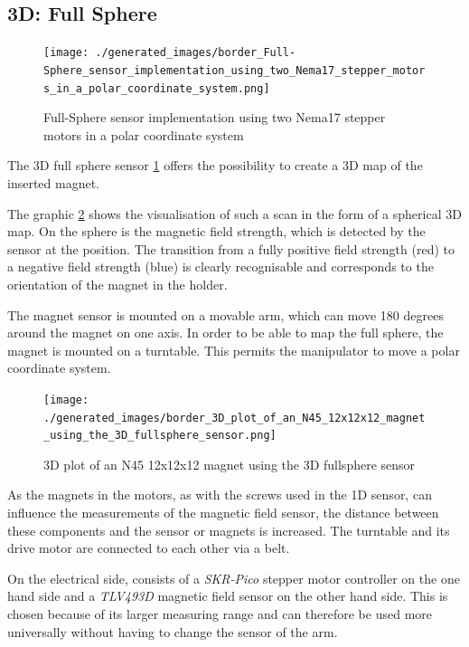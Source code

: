 \hypertarget{d-full-sphere}{%
\subsection{3D: Full Sphere}\label{d-full-sphere}}

\begin{figure}
\centering
\texttt{[image: ./generated\_images/border\_Full-Sphere\_sensor\_implementation\_using\_two\_Nema17\_stepper\_motors\_in\_a\_polar\_coordinate\_system.png]}
\caption{Full-Sphere sensor implementation using two Nema17 stepper
motors in a polar coordinate system
\label{Full-Sphere_sensor_implementation_using_two_Nema17_stepper_motors_in_a_polar_coordinate_system.png}}
\end{figure}

The 3D full sphere sensor
\ref{Full-Sphere_sensor_implementation_using_two_Nema17_stepper_motors_in_a_polar_coordinate_system.png}
offers the possibility to create a 3D map of the inserted magnet.

The graphic
\ref{3D_plot_of_an_N45_12x12x12_magnet_using_the_3D_fullsphere_sensor.png}
shows the visualisation of such a scan in the form of a spherical 3D
map. On the sphere is the magnetic field strength, which is detected by
the sensor at the position. The transition from a fully positive field
strength (red) to a negative field strength (blue) is clearly
recognisable and corresponds to the orientation of the magnet in the
holder.

The magnet sensor is mounted on a movable arm, which can move 180
degrees around the magnet on one axis. In order to be able to map the
full sphere, the magnet is mounted on a turntable. This permits the
manipulator to move a polar coordinate system.

\begin{figure}
\centering
\texttt{[image: ./generated\_images/border\_3D\_plot\_of\_an\_N45\_12x12x12\_magnet\_using\_the\_3D\_fullsphere\_sensor.png]}
\caption{3D plot of an N45 12x12x12 magnet using the 3D fullsphere
sensor
\label{3D_plot_of_an_N45_12x12x12_magnet_using_the_3D_fullsphere_sensor.png}}
\end{figure}

As the magnets in the motors, as with the screws used in the 1D sensor,
can influence the measurements of the magnetic field sensor, the
distance between these components and the sensor or magnets is
increased. The turntable and its drive motor are connected to each other
via a belt.

On the electrical side, consists of a \emph{SKR-Pico} stepper motor
controller on the one hand side and a \emph{TLV493D} magnetic field
sensor on the other hand side. This is chosen because of its larger
measuring range and can therefore be used more universally without
having to change the sensor of the arm.

